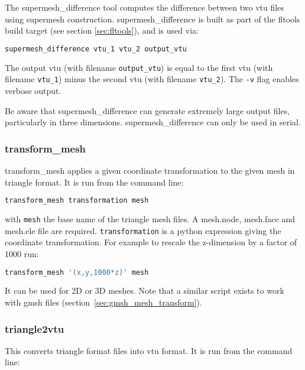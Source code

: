The supermesh\_difference tool computes the difference between two vtu
files using supermesh construction. supermesh\_difference is built as part of
the fltools build target (see section \ref{sec:fltools}), and is used via:

\begin{lstlisting}[language = Bash]
supermesh_difference vtu_1 vtu_2 output_vtu
\end{lstlisting}

The output vtu (with filename \lstinline[language = Bash]+output_vtu+)
is equal to the first vtu (with filename \lstinline[language = Bash]+vtu_1+)
minus the second vtu (with filename \lstinline[language = Bash]+vtu_2+).  The
\lstinline[language = Bash]+-v+ flag enables verbose output.

Be aware that supermesh\_difference can generate extremely large output files,
particularly in three dimensions. supermesh\_difference can only be used in
serial.


\subsubsection{transform\_mesh}
\label{sec:transform_mesh}

transform\_mesh applies a given coordinate transformation to the given mesh in triangle format. It is run from the command line:
\begin{lstlisting}[language = Bash]
transform_mesh transformation mesh
\end{lstlisting}
with \lstinline[language = Bash]+mesh+ the base name of the triangle mesh files. A mesh.node, mesh.face and mesh.ele file are required. \lstinline[language = Bash]+transformation+ is a python expression giving the coordinate transformation. For example to rescale the z-dimension by a factor of 1000 run:
\begin{lstlisting}[language = Bash]
transform_mesh '(x,y,1000*z)' mesh
\end{lstlisting}
It can be used for 2D or 3D meshes. Note that a similar script exists to work with gmsh files (section~\ref{sec:gmsh_mesh_transform}).


\subsubsection{triangle2vtu}
\label{sec:triangle2vtu}
This converts triangle format files into vtu format. It is run from the command line:


